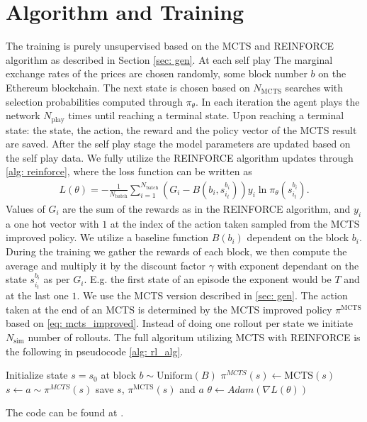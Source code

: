 \section{Algorithm and Training}
The training is purely unsupervised based on the MCTS and REINFORCE algorithm
as described in Section \ref{sec: gen}. At each self play The marginal
exchange rates of the prices are chosen randomly, some block number $b$ on
the Ethereum blockchain. The next state is chosen based on $N_{\text{MCTS}}$
searches with selection probabilities computed through $\pi_\theta$. In each
iteration the agent plays the network $N_{\text{play}}$ times until reaching
a terminal state. Upon reaching a terminal state: the state, the action, the
reward and the policy vector of the MCTS result are saved. After the self
play stage the model parameters are updated based on the self play data. We
fully utilize the REINFORCE algorithm updates through \ref{alg: reinforce},
where the loss function can be written as
\begin{align}
    L(\theta) = -\frac{1}{N_{\text{batch}}}
    \sum_{i=1}^{N_{\text{batch}}}\left( G_{i}-B(b_i, s^{b_i}_{i_{t}}) \right)y_i
    \ln \pi_{\theta} (s^{b_i}_{i_t}).
\end{align}
Values of $G_i$ are the sum of the rewards as in the REINFORCE algorithm, and
$y_i$ a one hot vector with $1$ at the index of the action taken sampled from
the MCTS improved policy. We utilize a baseline function $B(b_i)$ dependent
on the block $b_i$. During the training we gather the rewards of each block,
we then compute the average and multiply it by the discount factor $\gamma$
with exponent dependant on the state $s^{b_i}_{i_t}$ as per $G_i$. E.g. the
first state of an episode the exponent would be $T$ and at the last one $1$.
\newline
We use the MCTS version described in \ref{sec: gen}. The action taken at the end
of an MCTS is determined by the MCTS improved policy $\pi^{\text{MCTS}}$
based on \ref{eq: mcts_improved}. Instead of doing one rollout per state we
initiate $N_{\text{sim}}$ number of rollouts. The full algoritum utilizing
MCTS with REINFORCE is the following in pseudocode \ref{alg: rl_alg}.
\begin{algorithm}[H]
\caption{RL Algorithm}\label{alg: rl_alg}
    \begin{algorithmic}
                \State Initialize state $s = s_0$ at block $b \sim \text{Uniform}(B)$
                \State $\pi^{MCTS}(s)  \gets \text{MCTS}(s)$
                \State  $s \gets a \sim \pi^{MCTS}(s) $
                \State save $s$, $\pi^{\text{MCTS}}(s)$ and $a$
                \EndWhile
            \EndFor
            \State $\theta \gets Adam(\nabla L(\theta))$
        \EndFor
        \EndWhile
    \end{algorithmic}
\end{algorithm}
The code can be found at \cite[Github]{github}.
\newline

